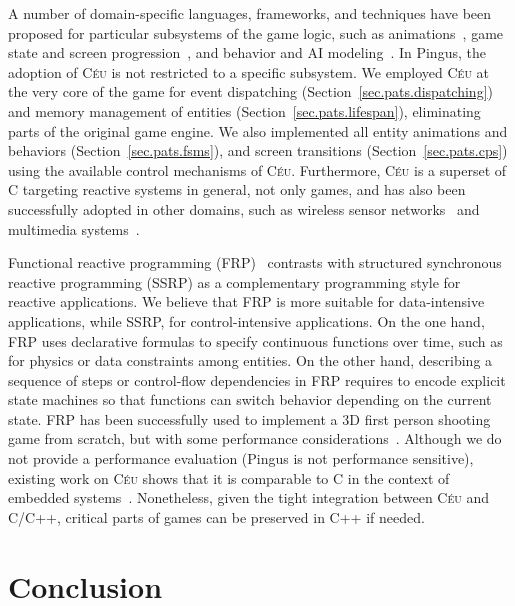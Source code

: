\documentclass[10pt, conference, compsocconf]{IEEEtran}
\newcommand{\CEU}{\textsc{C\'{e}u}\xspace}
\begin{document}
A number of domain-specific languages, frameworks, and techniques have been
proposed for particular subsystems of the game logic, such as
animations~\cite{games.anims.2006,games.anims.2003,games.anims.1996}, %
game state and screen progression~\cite{games.fsms.2006.1,games.fsms.2006.2}, and
behavior and AI modeling~\cite{games.bts,games.bts.unreal}.
%
In Pingus, the adoption of \CEU is not restricted to a specific subsystem.
We employed \CEU at the very core of the game for event dispatching
(Section~\ref{sec.pats.dispatching}) and memory management of entities
(Section~\ref{sec.pats.lifespan}), eliminating parts of the original game
engine.
We also implemented all entity animations and behaviors
(Section~\ref{sec.pats.fsms}), and screen transitions
(Section~\ref{sec.pats.cps})
using the available control mechanisms of \CEU.
%
Furthermore, \CEU is a superset of C targeting reactive systems in general, not
only games, and has also been successfully adopted in other domains, such as
    wireless sensor networks~\cite{ceu.sensys13,ceu.terra} and
    multimedia systems~\cite{ceumedia.webmedia16}.

Functional reactive programming (FRP)~\cite{frp.fran} contrasts with
structured synchronous reactive programming (SSRP) as a complementary
programming style for reactive applications.
%
We believe that FRP is more suitable for data-intensive applications, while 
SSRP, for control-intensive applications.
%
On the one hand, FRP uses declarative formulas to specify continuous functions 
over time, such as for physics or data constraints among entities.
%
On the other hand, describing a sequence of steps or control-flow dependencies
in FRP requires to encode explicit state machines so that functions can switch
behavior depending on the current state.
%
FRP has been successfully used to implement a 3D first person shooting game
from scratch, but with some performance considerations~\cite{games.frag}.
%
Although we do not provide a performance evaluation (Pingus is not performance
sensitive), existing work on \CEU shows that it is comparable to C in the
context of embedded systems~\cite{ceu.sensys13}.
Nonetheless, given the tight integration between \CEU and C/C++, critical parts
of games can be preserved in C++ if needed.

\section{Conclusion}
\label{sec.conclusion}
\end{document}
